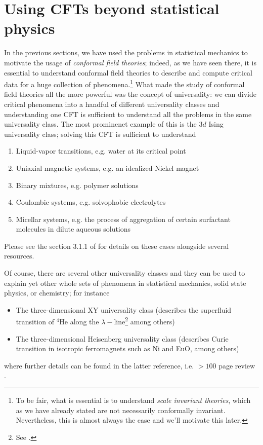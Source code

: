 \section{Using CFTs beyond statistical physics}

In the previous sections, we have used the problems in statistical mechanics to motivate the usage of \emph{conformal field theories}; indeed, as we have seen there, it is essential to understand conformal field theories to describe and compute critical data for a huge collection of phenomena.\footnote{To be fair, what is essential is to understand \emph{scale invariant theories}, which as we have already stated are not necessarily conformally invariant. Nevertheless, this is almost always the case and we'll motivate this later.} What made the study of conformal field theories all the more powerful was the concept of universality: we can divide critical phenomena into a handful of different universality classes and understanding one CFT is sufficient to understand all the problems in the same universality class. The most prominenet example of this is the $3d$ Ising universality class; solving this CFT is sufficient to understand
\begin{enumerate}
	\item Liquid-vapor transitions, e.g. water at its critical point
	\item Uniaxial magnetic systems, e.g. an idealized Nickel magnet
	\item Binary mixtures, e.g. polymer solutions 
	\item Coulombic systems, e.g. solvophobic electrolytes
	\item Micellar systems, e.g. the process of aggregation of certain surfactant molecules in dilute aqueous solutions
\end{enumerate}
Please see the section 3.1.1 of \cite{Pelissetto:2000ek} for details on these cases alongside several resources. 

Of course, there are several other universality classes and they can be used to explain yet other whole sets of phenomena in statistical mechanics, solid state physics, or chemistry; for instance
\begin{itemize}
	\item The three-dimensional XY universality class (describes the superfluid transition of $^4$He along the $\lambda-$line\footnote{See \figref{\ref{fig: lambda line}}.} among others)
	\item The three-dimensional Heisenberg universality class (describes Curie transition in isotropic ferromagnets such as Ni and EuO, among others)
\end{itemize}
where further details can be found in the latter reference, i.e. $>100$ page review \cite{Pelissetto:2000ek}.

